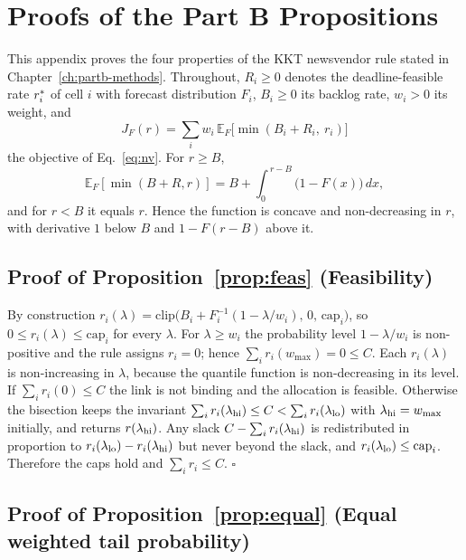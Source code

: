 \chapter{Proofs of the Part B Propositions}
\label{app:proofs}
\thispagestyle{plain}

This appendix proves the four properties of the KKT newsvendor rule stated in Chapter~\ref{ch:partb-methods}. Throughout, $R_i \ge 0$ denotes the deadline-feasible rate $r^{\ast}_i$ of cell $i$ with forecast distribution $F_i$, $B_i \ge 0$ its backlog rate, $w_i > 0$ its weight, and
\[
  J_F(r) = \sum_i w_i\,\mathbb{E}_F\big[\min(B_i + R_i,\ r_i)\big]
\]
the objective of Eq.~\eqref{eq:nv}. For $r \ge B$,
\begin{equation}
  \mathbb{E}_F[\min(B + R, r)] = B + \int_0^{\,r-B} \big(1 - F(x)\big)\,dx ,
  \label{eq:app-int}
\end{equation}
and for $r < B$ it equals $r$. Hence the function is concave and non-decreasing in $r$, with derivative $1$ below $B$ and $1 - F(r - B)$ above it.

\section*{Proof of Proposition~\ref{prop:feas} (Feasibility)}

By construction $r_i(\lambda) = \mathrm{clip}\big(B_i + F_i^{-1}(1-\lambda/w_i),\,0,\,\mathrm{cap}_i\big)$, so $0 \le r_i(\lambda) \le \mathrm{cap}_i$ for every $\lambda$. For $\lambda \ge w_i$ the probability level $1 - \lambda/w_i$ is non-positive and the rule assigns $r_i = 0$; hence $\sum_i r_i(w_{\max}) = 0 \le C$. Each $r_i(\lambda)$ is non-increasing in $\lambda$, because the quantile function is non-decreasing in its level. If $\sum_i r_i(0) \le C$ the link is not binding and the allocation is feasible. Otherwise the bisection keeps the invariant $\sum_i r_i(\lambda_{\rm hi}) \le C < \sum_i r_i(\lambda_{\rm lo})$ with $\lambda_{\rm hi} = w_{\max}$ initially, and returns $r(\lambda_{\rm hi})$. Any slack $C - \sum_i r_i(\lambda_{\rm hi})$ is redistributed in proportion to $r_i(\lambda_{\rm lo}) - r_i(\lambda_{\rm hi})$ but never beyond the slack, and $r_i(\lambda_{\rm lo}) \le \mathrm{cap}_i$. Therefore the caps hold and $\sum_i r_i \le C$. \hfill$\square$

\section*{Proof of Proposition~\ref{prop:equal} (Equal weighted tail probability)}

